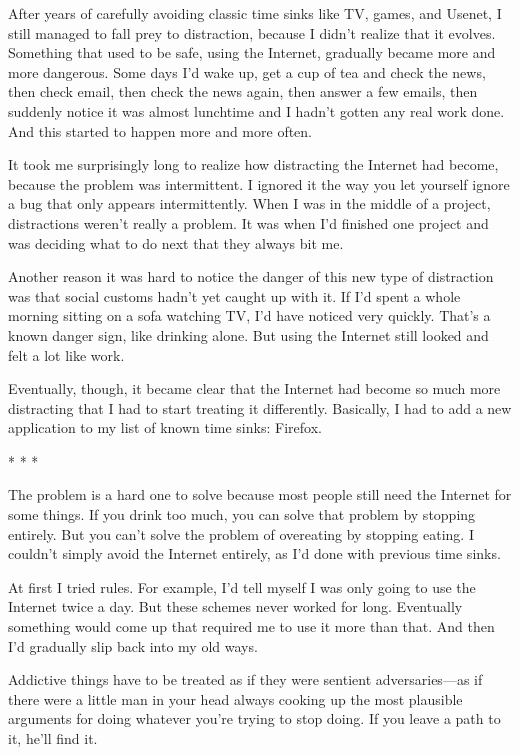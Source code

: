 After years of carefully avoiding classic time sinks like TV, games, and
Usenet, I still managed to fall prey to distraction, because I didn't
realize that it evolves. Something that used to be safe, using the
Internet, gradually became more and more dangerous. Some days I'd wake
up, get a cup of tea and check the news, then check email, then check
the news again, then answer a few emails, then suddenly notice it was
almost lunchtime and I hadn't gotten any real work done. And this
started to happen more and more often.

It took me surprisingly long to realize how distracting the Internet had
become, because the problem was intermittent. I ignored it the way you
let yourself ignore a bug that only appears intermittently. When I was
in the middle of a project, distractions weren't really a problem. It
was when I'd finished one project and was deciding what to do next that
they always bit me.

Another reason it was hard to notice the danger of this new type of
distraction was that social customs hadn't yet caught up with it. If I'd
spent a whole morning sitting on a sofa watching TV, I'd have noticed
very quickly. That's a known danger sign, like drinking alone. But using
the Internet still looked and felt a lot like work.

Eventually, though, it became clear that the Internet had become so much
more distracting that I had to start treating it differently. Basically,
I had to add a new application to my list of known time sinks: Firefox.

* * *

The problem is a hard one to solve because most people still need the
Internet for some things. If you drink too much, you can solve that
problem by stopping entirely. But you can't solve the problem of
overeating by stopping eating. I couldn't simply avoid the Internet
entirely, as I'd done with previous time sinks.

At first I tried rules. For example, I'd tell myself I was only going to
use the Internet twice a day. But these schemes never worked for long.
Eventually something would come up that required me to use it more than
that. And then I'd gradually slip back into my old ways.

Addictive things have to be treated as if they were sentient
adversaries---as if there were a little man in your head always cooking
up the most plausible arguments for doing whatever you're trying to stop
doing. If you leave a path to it, he'll find it.

